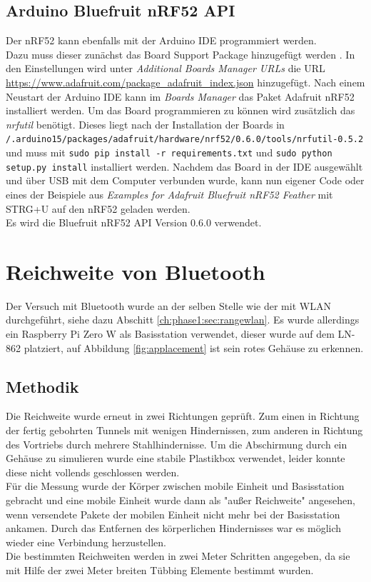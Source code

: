 \subsection{Arduino Bluefruit nRF52 API}
Der nRF52 kann ebenfalls mit der Arduino IDE programmiert werden.\\
Dazu muss dieser zunächst das Board Support Package hinzugefügt werden \cite{townsend2017nrf}.
In den Einstellungen wird unter \textit{Additional Boards Manager URLs} die URL \url{https://www.adafruit.com/package_adafruit_index.json} hinzugefügt.
Nach einem Neustart der Arduino IDE kann im \textit{Boards Manager} das Paket Adafruit nRF52 installiert werden.
Um das Board programmieren zu können wird zusätzlich das \textit{nrfutil} benötigt.
Dieses liegt nach der Installation der Boards in \\\texttt{/.arduino15/packages/adafruit/hardware/nrf52/0.6.0/tools/nrfutil-0.5.2} und muss mit \texttt{sudo pip install -r requirements.txt} und \texttt{sudo python setup.py install} installiert werden.
Nachdem das Board in der IDE ausgewählt und über USB mit dem Computer verbunden wurde, kann nun eigener Code oder eines der Beispiele aus \textit{Examples for Adafruit Bluefruit nRF52 Feather} mit STRG+U auf den nRF52 geladen werden.\\
Es wird die Bluefruit nRF52 API Version 0.6.0 verwendet.

\section{Reichweite von Bluetooth}
Der Versuch mit Bluetooth wurde an der selben Stelle wie der mit WLAN durchgeführt, siehe dazu Abschitt \ref{ch:phase1:sec:rangewlan}.
Es wurde allerdings ein Raspberry Pi Zero W als Basisstation verwendet, dieser wurde auf dem LN-862 platziert, auf Abbildung \ref{fig:applacement} ist sein rotes Gehäuse zu erkennen.

\subsection{Methodik}
Die Reichweite wurde erneut in zwei Richtungen geprüft. 
Zum einen in Richtung der fertig gebohrten Tunnels mit wenigen Hindernissen, zum anderen in Richtung des Vortriebs durch mehrere Stahlhindernisse.
Um die Abschirmung durch ein Gehäuse zu simulieren wurde eine stabile Plastikbox verwendet, leider konnte diese nicht vollends geschlossen werden.\\
Für die Messung wurde der Körper zwischen mobile Einheit und Basisstation gebracht und eine mobile Einheit wurde dann als "außer Reichweite" angesehen, wenn versendete Pakete der mobilen Einheit nicht mehr bei der Basisstation ankamen.
Durch das Entfernen des körperlichen Hindernisses war es möglich wieder eine Verbindung herzustellen.\\
Die bestimmten Reichweiten werden in zwei Meter Schritten angegeben, da sie mit Hilfe der zwei Meter breiten Tübbing Elemente bestimmt wurden.

